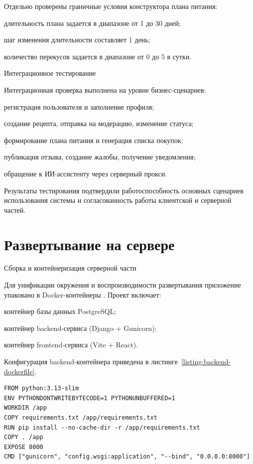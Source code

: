 Отдельно проверены граничные условия конструктора плана питания:
\begin{compactlist}
  \item длительность плана задается в диапазоне от 1 до 30 дней;
  \item шаг изменения длительности составляет 1 день;
  \item количество перекусов задается в диапазоне от 0 до 5 в сутки.
\end{compactlist}

Интеграционное тестирование

Интеграционная проверка выполнена на уровне бизнес-сценариев:
\begin{compactlist}
  \item регистрация пользователя и заполнение профиля;
  \item создание рецепта, отправка на модерацию, изменение статуса;
  \item формирование плана питания и генерация списка покупок;
  \item публикация отзыва, создание жалобы, получение уведомления;
  \item обращение к ИИ-ассистенту через серверный прокси.
\end{compactlist}

Результаты тестирования подтвердили работоспособность основных сценариев использования системы и согласованность работы клиентской и серверной частей.

\section{Развертывание на сервере}

Сборка и контейнеризация серверной части

Для унификации окружения и воспроизводимости развертывания приложение упаковано в Docker-контейнеры \cite{docker_docs_2026}. Проект включает:
\begin{compactlist}
  \item контейнер базы данных PostgreSQL;
  \item контейнер backend-сервиса (Django + Gunicorn);
  \item контейнер frontend-сервиса (Vite + React).
\end{compactlist}

Конфигурация backend-контейнера приведена в листинге~\ref{listing:backend-dockerfile}.

\begin{listing}[H]
\caption{Dockerfile серверной части}
\label{listing:backend-dockerfile}
\begin{mdframed}
\begin{verbatim}
FROM python:3.13-slim
ENV PYTHONDONTWRITEBYTECODE=1 PYTHONUNBUFFERED=1
WORKDIR /app
COPY requirements.txt /app/requirements.txt
RUN pip install --no-cache-dir -r /app/requirements.txt
COPY . /app
EXPOSE 8000
CMD ["gunicorn", "config.wsgi:application", "--bind", "0.0.0.0:8000"]
\end{verbatim}
\end{mdframed}
\end{listing}

